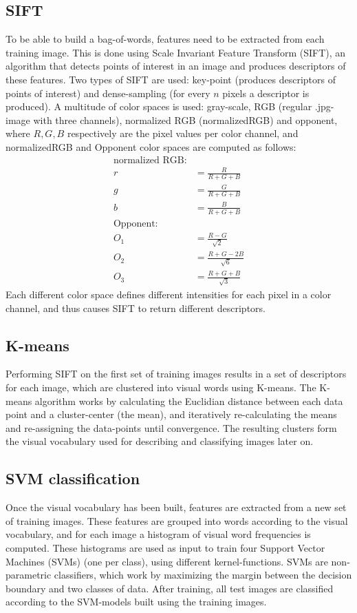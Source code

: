 \documentclass{article} %
\begin{document}
\subsection{SIFT}
To be able to build a bag-of-words, features need to be extracted from each training image. This is done using Scale Invariant Feature Transform (SIFT), an algorithm that detects points of interest in an image and produces descriptors of these features. Two types of SIFT are used: key-point (produces descriptors of points of interest) and dense-sampling (for every $n$ pixels a descriptor is produced). A multitude of color spaces is used: gray-scale, RGB (regular .jpg-image with three channels), normalized RGB (normalizedRGB) and opponent, where $R,G,B$ respectively are the pixel values per color channel, and normalizedRGB and Opponent color spaces are computed as follows:
\begin{align*}
\text{normalized RGB:}\\
r&= \frac{R}{R+G+B}\\
g&=\frac{G}{R+G+B} \\
b&= \frac{B}{R+G+B}\\
\text{Opponent:}\\
O_1&= \frac{R-G}{\sqrt{2}}\\
O_2&= \frac{R+G-2B}{\sqrt{6}}\\
O_3&= \frac{R+G+B}{\sqrt{3}}
\end{align*}
Each different color space defines different intensities for each pixel in a color channel, and thus causes SIFT to return different descriptors.
\subsection{K-means}
Performing SIFT on the first set of training images results in a set of descriptors for each image, which are clustered into visual words using K-means. The K-means algorithm works by calculating the Euclidian distance between each data point and a cluster-center (the mean), and iteratively re-calculating the means and re-assigning the data-points until convergence. The resulting clusters form the visual vocabulary used for describing and classifying images later on. 
\subsection{SVM classification}
Once the visual vocabulary has been built, features are extracted from a new set of training images. These features are grouped into words according to the visual vocabulary, and for each image a histogram of visual word frequencies is computed.
These histograms are used as input to train four Support Vector Machines (SVMs) (one per class), using different kernel-functions. SVMs are non-parametric classifiers, which work by maximizing the margin between the decision boundary and two classes of data.
After training, all test images are classified according to the SVM-models built using the training images. 
\end{document}
